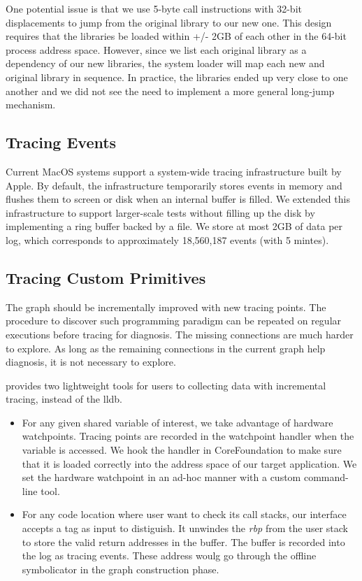 One potential issue is that we use 5-byte call instructions with 32-bit
displacements to jump from the original library to our new one.  This design
requires that the libraries be loaded within +/- 2GB of each other in the
64-bit process address space.  However, since we list each original library as
a dependency of our new libraries, the system loader will map each new and
original library in sequence.  In practice, the libraries ended up very close
to one another and we did not see the need to implement a more general
long-jump mechanism.

\subsection{Tracing Events}
Current MacOS systems support a system-wide tracing infrastructure built by
Apple.  By default, the infrastructure temporarily stores events in memory and
flushes them to screen or disk when an internal buffer is filled.  We extended
this infrastructure to support larger-scale tests without filling up the disk
by implementing a ring buffer backed by a file.  We store at most 2GB of data
per log, which corresponds to approximately 18,560,187 events (with 5 mintes).

\subsection{Tracing Custom Primitives} \label{subsec:tcp}
The graph should be incrementally improved with new tracing points.  The
procedure to discover such programming paradigm can be repeated on regular
executions before tracing for diagnosis.  The missing connections are much
harder to explore.  As long as the remaining connections in the current graph
help diagnosis, it is not necessary to explore.

\xxx provides two lightweight tools for users to collecting data with
incremental tracing, instead of the lldb.

\begin {itemize}

\item For any given shared variable of interest, we take advantage of hardware
watchpoints.  Tracing points are recorded in the watchpoint handler when the
variable is accessed.  We hook the handler in CoreFoundation to make sure that
it is loaded correctly into the address space of our target application.  We
set the hardware watchpoint in an ad-hoc manner with a custom command-line
tool.

\item For any code location where user want to check its call stacks, our
interface accepts a tag as input to distiguish.  It unwindes the \textit{rbp} from the
user stack to store the valid return addresses in the buffer. The buffer is
recorded into the log as tracing events.  These address woulg go through the
offline symbolicator in the graph construction phase.
\end{itemize}

